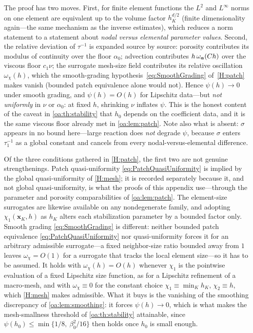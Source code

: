 \begin{pedagogy}
The proof has two moves. First, for finite element functions the $L^2$ and
$L^\infty$ norms on one element are equivalent up to the volume factor
$h_K^{d/2}$ (finite dimensionality again---the same mechanism as the inverse
estimates), which reduces a norm statement to a statement about \emph{nodal
versus elemental parameter values}. Second, the relative deviation of
$\tau^{-1}$ is expanded source by source: porosity contributes its modulus of
continuity over the floor $\alpha_0$; advection contributes $h\,\omega_{\boldsymbol{a}}(Ch)$
over the viscous floor $c_1\nu$; the surrogate mesh-size field contributes its
relative oscillation $\omega_\chi(h)$, which the smooth{\hyp}grading hypothesis~\cref{eq:SmoothGrading}
of~\cref{H:patch} makes vanish (bounded patch equivalence alone would not). Hence $\psi(h) \to 0$ under
smooth grading, and $\psi(h) = O(h)$ for Lipschitz data---but \emph{not uniformly} in $\nu$ or
$\alpha_0$: at fixed $h$, shrinking $\nu$ inflates $\psi$. This is the honest
content of the caveat in \cref{oa:th:stability} that $h_0$ depends on the
coefficient data, and it is the same viscous floor already met in
\cref{oa:lem:patch}. Note also what is absent: $\sigma$ appears in no bound
here---large reaction does \emph{not} degrade $\psi$, because $\sigma$ enters
$\tau_1^{-1}$ as a global constant and cancels from every nodal-versus-elemental
difference.
\end{pedagogy}

\begin{remark}
\label{oa:rem:patchgrading}
Of the three conditions gathered in \cref{H:patch}, the first two are not genuine
strengthenings. Patch quasi{\hyp}uniformity \cref{eq:PatchQuasiUniformity} is implied by the
global quasi{\hyp}uniformity of \cref{H:mesh}; it is recorded separately because it, and not
global quasi{\hyp}uniformity, is what the proofs of this appendix use---through the parameter and
porosity comparabilities of \cref{oa:lem:patch}. The element{\hyp}size surrogates are likewise
available on any nondegenerate family, and adopting $\chi_1(\boldsymbol{x}_K,h)$ as $h_K$ alters
each stabilization parameter by a bounded factor only. Smooth grading \cref{eq:SmoothGrading} is
different: neither bounded patch equivalence \cref{eq:PatchQuasiUniformity} nor
quasi{\hyp}uniformity forces it for an arbitrary admissible surrogate---a fixed
neighbor{\hyp}size ratio bounded away from $1$ leaves $\omega_\chi = O(1)$ for a surrogate that
tracks the local element size---so it has to be assumed. It holds with $\omega_\chi(h) = O(h)$
whenever $\chi_1$ is the pointwise evaluation of a fixed Lipschitz size function, as for a
Lipschitz refinement of a macro{\hyp}mesh, and with $\omega_\chi \equiv 0$ for the constant
choice $\chi_1 \equiv \min_K h_K$, $\chi_2 \equiv h$, which \cref{H:mesh} makes admissible. What
it buys is the vanishing of the smoothing discrepancy of \cref{oa:lem:smoothing}: it forces
$\psi(h) \to 0$, which is what makes the mesh{\hyp}smallness threshold of
\cref{oa:th:stability} attainable, since $\psi(h_0) \le \min\{1/8,\ \beta_0^2/16\}$ then holds
once $h_0$ is small enough.
\end{remark}

